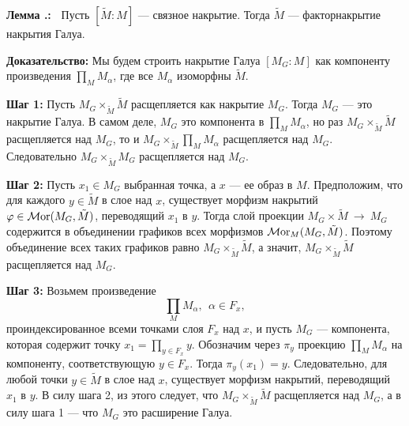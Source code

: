 \documentclass[12pt]{book}
\newcommand{\arrow}{{\:\longrightarrow\:}}
\def\endproof{\hbox{\vrule width 5pt height 5pt depth 0pt}}
\renewcommand{\phi}{\varphi}
\newcommand{\Mor}{\operatorname{{\cal M}or}}
\theoremstyle{upshape}
\theoremstyle{generic}
\theoremstyle{upshapenonumber}
\newcommand{\следствие}{%
     \refstepcounter{teorema}
     {\noindent\bf Следствие \thechapter.\arabic{teorema}:\ }}
\newcommand{\пример}{%
     \refstepcounter{teorema}
     {\noindent\bf Пример \thechapter.\arabic{teorema}:\ }}
\newcommand{\лемма}{%
     \refstepcounter{teorema}
     {\noindent\bf Лемма \thechapter.\arabic{teorema}:\ }}
\newcommand{\теорема}{%
     \refstepcounter{teorema}
     {\noindent\bf Теорема \thechapter.\arabic{teorema}:\ }}
\newcommand{\утверждение}{%
     \refstepcounter{teorema}
     {\noindent\bf Утверждение \thechapter.\arabic{teorema}:\ }}
\def\хфилл{\hfill}
\def\ноиндент{\noindent}
\def\бф{\bf}
\begin{document}
\лемма
Пусть $[\tilde M: M]$ --- связное накрытие. 
Тогда $\tilde M$ --- факторнакрытие накрытия Галуа.

\хфилл

\ноиндент
{\бф Доказательство:} 
Мы будем строить накрытие Галуа $[M_G:M]$ как компоненту
произведения $\prod_M M_\alpha$, где все $M_\alpha$ изоморфны $\tilde M$.

\хфилл

\ноиндент
{\бф Шаг 1:} Пусть $M_G \times_{\tilde M} \tilde M$ расщепляется
как накрытие $M_G$. Тогда $M_G$ --- это накрытие Галуа. В самом деле,
$M_G$ это компонента в $\prod_M M_\alpha$, но раз
$M_G \times_{\tilde M} \tilde M$ расщепляется над $M_G$,
то и $M_G \times_{\tilde M} \prod_M M_\alpha$ расщепляется
над $M_G$. Следовательно $M_G \times_{\tilde M} M_G$ расщепляется
над $M_G$. 


\хфилл

\ноиндент
{\бф Шаг 2:} Пусть $x_1 \in M_G$ выбранная точка,
а $x$ --- ее образ в $M$. Предположим, что 
для каждого $y\in \tilde M$ в слое над $x$,
существует морфизм накрытий $\phi\in \Mor(M_G, \tilde M)$,
 переводящий $x_1$ в $y$. Тогда слой проекции 
$M_G \times \tilde M \arrow M_G$ содержится
в объединении графиков всех морфизмов
$\Mor_M(M_G, \tilde M)$. Поэтому
объединение всех таких графиков
равно $M_G \times_{\tilde M} \tilde M$,
а значит, $M_G \times_{\tilde M} \tilde M$ расщепляется
над $M_G$.

\хфилл

\ноиндент
{\бф Шаг 3:} Возьмем произведение
\[ \prod_M M_\alpha,\ \  \alpha \in F_x,\] 
проиндексированное всеми
точками слоя $F_x$ над $x$, и пусть $M_G$ --- компонента,
которая содержит точку $x_1 = \prod_{y\in F_x} y$.
Обозначим через $\pi_y$ проекцию $\prod_M M_\alpha$
на компоненту, соответствующую $y\in F_x$.
Тогда $\pi_y(x_1) =y$. Следовательно, 
для любой точки $y\in \tilde M$ в слое над $x$,
существует морфизм накрытий, переводящий
$x_1$ в $y$. В силу шага 2, из этого следует,
что $M_G \times_{\tilde M} \tilde M$ расщепляется
над $M_G$, а в силу шага 1 --- что $M_G$ это
расширение Галуа. \endproof 

\хфилл
\end{document}
